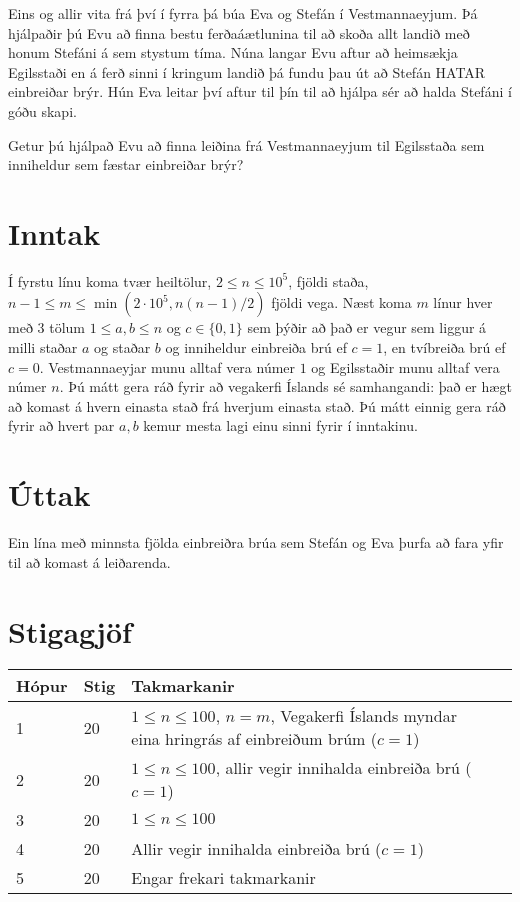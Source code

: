 
\noindent
Eins og allir vita frá því í fyrra þá búa Eva og Stefán í Vestmannaeyjum. Þá hjálpaðir þú Evu að finna bestu ferðaáætlunina til að skoða allt landið með honum Stefáni á sem stystum tíma. Núna langar Evu aftur að heimsækja Egilsstaði en á ferð sinni í kringum landið þá fundu þau út að Stefán HATAR einbreiðar brýr. Hún Eva leitar því aftur til þín til að hjálpa sér að halda Stefáni í góðu skapi.

Getur þú hjálpað Evu að finna leiðina frá Vestmannaeyjum til Egilsstaða sem inniheldur sem fæstar einbreiðar brýr?


\section*{Inntak}
Í fyrstu línu koma tvær heiltölur, $2 \leq n \leq 10^5$, fjöldi staða, $n-1 \leq m \leq \min{(2\cdot 10^5, n(n-1)/2)}$ fjöldi vega.
Næst koma $m$ línur hver með $3$ tölum $1 \leq a, b \leq n$ og $c \in \{0, 1\}$ sem þýðir að það er vegur sem liggur á milli staðar $a$ og staðar $b$ og inniheldur einbreiða brú ef $c = 1$, en tvíbreiða brú ef $c=0$.
Vestmannaeyjar munu alltaf vera númer $1$ og Egilsstaðir munu alltaf vera númer $n$.
Þú mátt gera ráð fyrir að vegakerfi Íslands sé samhangandi: það er hægt að komast á hvern einasta stað frá hverjum einasta stað.
Þú mátt einnig gera ráð fyrir að hvert par $a, b$ kemur mesta lagi einu sinni fyrir í inntakinu.

\section*{Úttak}
Ein lína með minnsta fjölda einbreiðra brúa sem Stefán og Eva þurfa að fara yfir til að komast á leiðarenda.

\section*{Stigagjöf}
\begin{tabular}{|l|l|l|l|}
\hline
Hópur & Stig & Takmarkanir \\ \hline
1     & 20  & $1 \leq n \leq 100$, $n = m$, Vegakerfi Íslands myndar eina hringrás af einbreiðum brúm ($c = 1$) \\ \hline
2     & 20  & $1 \leq n \leq 100$, allir vegir innihalda einbreiða brú ($c = 1$) \\ \hline
3     & 20  & $1 \leq n \leq 100$ \\ \hline
4     & 20  & Allir vegir innihalda einbreiða brú ($c = 1$) \\ \hline
5     & 20  & Engar frekari takmarkanir \\ \hline

\end{tabular}
